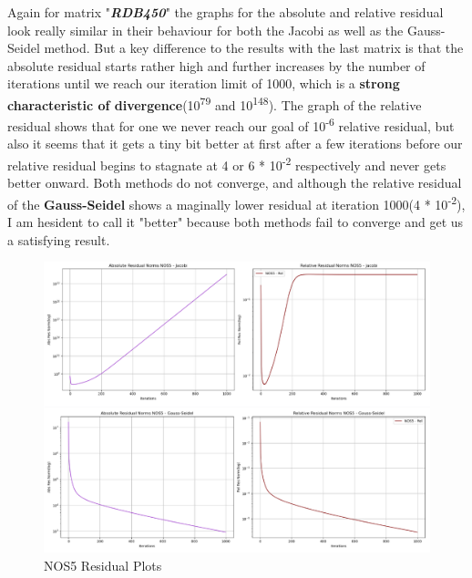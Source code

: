 \documentclass{article}
\begin{document}
    Again for matrix "\textbf{\textit{RDB450}}" the graphs for the absolute and relative residual look really similar in their behaviour for both the Jacobi as well as the Gauss-Seidel method. But a key difference to the results with the last matrix is that the absolute residual starts rather high and further increases by the number of iterations until we reach our iteration limit of 1000, which is a\textbf{ strong characteristic of divergence}(10\textsuperscript{79} and 10\textsuperscript{148}). The graph of the relative residual shows that for one we never reach our goal of 10\textsuperscript{-6} relative residual, but also it seems that it gets a tiny bit better at first after a few iterations before our relative residual begins to stagnate at 4 or 6 * 10\textsuperscript{-2} respectively and never gets better onward. 
    Both methods do not converge, and although the relative residual of the \textbf{Gauss-Seidel} shows a maginally lower residual at iteration 1000(4 * 10\textsuperscript{-2}), I am hesident to call it "better" because both methods fail to converge and get us a satisfying result.
\begin{figure}[h!]
    \centering
    \includegraphics[width=1\linewidth]{nos5_res_plot.PNG}
    \caption{NOS5 Residual Plots}
\end{figure}
    \pagebreak
    
\end{document}
